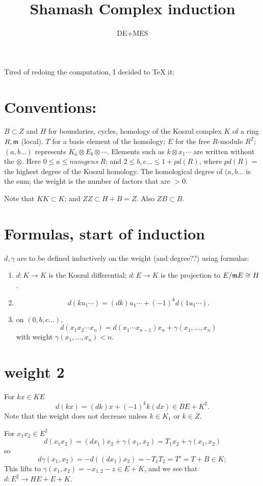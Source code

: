 \documentclass[11pt]{amsart}
\title{Shamash Complex induction}
\author{DE+MES}
\def\g{{\gamma}}
\def\mm{{\frak m}}
\begin{document}
\maketitle
Tired of redoing the computation, I decided to TeX it:

\section{Conventions:} $B\subset Z$ and  $H$ for boundaries, cycles, homology of the Koszul complex $K$ of a  ring $R,\mm$ (local). $T$ for a basis element of the homology; $E$ for the free $R$-module $R^T$; 
$(a,b...)$ represents $K_a\otimes E_b\otimes \cdots$. Elements such as $k\otimes x_1\cdots$ are written without the $\otimes$.
Here $0\leq a\leq numgens\ R$; and $2\leq b,c\dots\leq 1+pd(R)$, where $pd(R)$ = the highest degree of the Koszul homology. The homological degree of $(a,b\dots$ is the sum; the weight is the
number of factors that are $>0$.

Note that $KK \subset K$; and $ZZ\subset H+B = Z$. Also $ZB\subset B$.

\section{Formulas, start of induction}
$d,\g$ are to be defined inductively on the weight (and degree??) using formulas:

\begin{enumerate}
\item $d:K\to K$ is the Koszul differential; $d: E \to K$ is the projection to $E/\mm E \cong H$.
\item 
$$
d(ku_1\cdots) = (dk)u_1\cdots +(-1)^kd(1u_1\cdots).
$$
\item
on $(0,b,c\dots)$, 
$$
d(x_1x_2\cdots x_n) = d(x_1\cdots x_{n-1})x_n+\g(x_1,\dots, x_n)
$$
with weight $\g(x_1,\dots, x_n)<n$.
\end{enumerate}

\section{weight 2} 
For $kx\in KE$ 
$$
d(kx) = (dk)x+(-1)^k k(dx) \in BE+K^2.
$$
Note that the weight does not decrease unless $k\in K_1$ or $k \in Z$.

For $x_1x_2\in E^2$
$$
d(x_1x_2)= (dx_1)x_2 +\g(x_1,x_2) = T_1x_2+\gamma(x_1,x_2)
$$
so 
$$
d\gamma(x_1,x_2) = -d((dx_1)x_2) = -T_1T_2 = T' = T+B  \in K;
$$
This lifts to $\g(x_1,x_2)=-x_{1,2}-z \in E+K$, 
and we see that $d:E^2\to HE+ E+K$.
\end{document}
